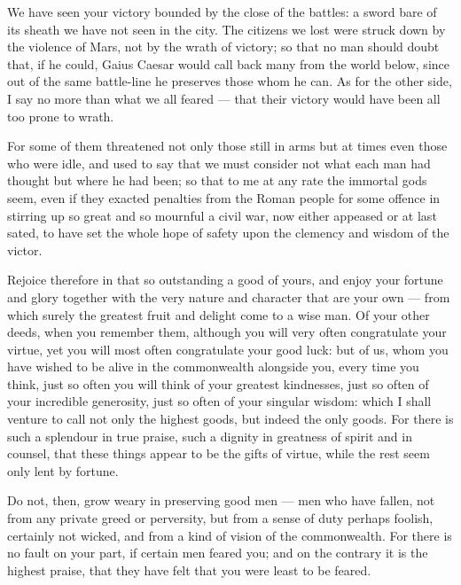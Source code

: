  We have seen your victory bounded by the close of the battles: a sword bare of its sheath we have not seen in the city. The citizens we lost were struck down by the violence of Mars, not by the wrath of victory; so that no man should doubt that, if he could, Gaius Caesar would call back many from the world below, since out of the same battle-line he preserves those whom he can. As for the other side, I say no more than what we all feared --- that their victory would have been all too prone to wrath.

 For some of them threatened not only those still in arms but at times even those who were idle, and used to say that we must consider not what each man had thought but where he had been; so that to me at any rate the immortal gods seem, even if they exacted penalties from the Roman people for some offence in stirring up so great and so mournful a civil war, now either appeased or at last sated, to have set the whole hope of safety upon the clemency and wisdom of the victor.

 Rejoice therefore in that so outstanding a good of yours, and enjoy your fortune and glory together with the very nature and character that are your own --- from which surely the greatest fruit and delight come to a wise man. Of your other deeds, when you remember them, although you will very often congratulate your virtue, yet you will most often congratulate your good luck: but of us, whom you have wished to be alive in the commonwealth alongside you, every time you think, just so often you will think of your greatest kindnesses, just so often of your incredible generosity, just so often of your singular wisdom: which I shall venture to call not only the highest goods, but indeed the only goods. For there is such a splendour in true praise, such a dignity in greatness of spirit and in counsel, that these things appear to be the gifts of virtue, while the rest seem only lent by fortune.

 Do not, then, grow weary in preserving good men --- men who have fallen, not from any private greed or perversity, but from a sense of duty perhaps foolish, certainly not wicked, and from a kind of vision of the commonwealth. For there is no fault on your part, if certain men feared you; and on the contrary it is the highest praise, that they have felt that you were least to be feared.

